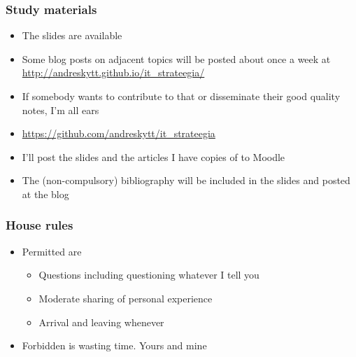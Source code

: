 \begin{frame}[fragile]
  \frametitle{Study materials}
	\begin{itemize}
		\item The slides are available
		\item Some blog posts on adjacent topics will be posted about once a week at \url{http://andreskytt.github.io/it_strateegia/}
		\item If somebody wants to contribute to that or disseminate their good quality notes, I'm all ears
		\item \url{https://github.com/andreskytt/it_strateegia}
		\item I'll post the slides and the articles I have copies of to Moodle
		\item The (non-compulsory) bibliography will be included in the slides and posted at the blog
	\end{itemize}
\end{frame}


\begin{frame}[fragile]
  \frametitle{House rules}
	\begin{itemize}
		\item Permitted are 
		\begin{itemize}
			\item Questions including questioning whatever I tell you
			\item Moderate sharing of personal experience
			\item Arrival and leaving whenever
		\end{itemize}
		\item Forbidden is wasting time. Yours and mine
	\end{itemize}
\end{frame}

